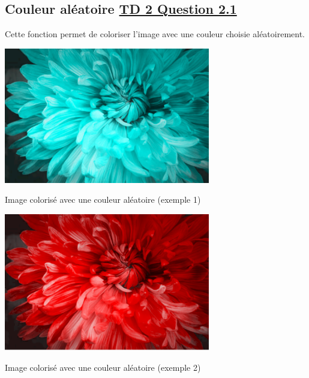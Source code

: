 \documentclass{article}
\begin{document}
\subsection{Couleur aléatoire \underline{TD 2 Question 2.1}}
Cette fonction permet de coloriser l'image avec une couleur choisie aléatoirement.
\bigbreak

\begin{center} 
    \includegraphics[width=9cm]{../RandomCouleur1}

    Image colorisé avec une couleur aléatoire (exemple 1)
    \end{center}
\bigbreak

\begin{center} 
    \includegraphics[width=9cm]{../RandomCouleur2}

    Image colorisé avec une couleur aléatoire (exemple 2)
    \end{center}
\end{document}
